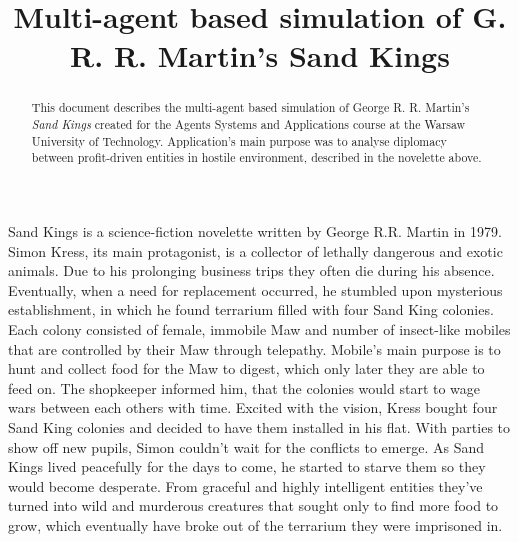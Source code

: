 \documentclass[conference]{IEEEtran}
\title{Multi-agent based simulation of G. R. R. Martin's Sand Kings}
\author{
\IEEEauthorblockN{Jakub Ciecierski, Viet Ba Mai, \\
					Michal Slupczynski and Wojciech Zyskowski}
					
\IEEEauthorblockA{Faculty of Mathematics and Information Science,\\ 
					Warsaw University of Technology \\
					Plac Politechniki 1, 00-660 Warsaw, Poland}
}
\begin{document}
\maketitle








\begin{abstract}

This document describes the multi-agent based simulation of George R. R. Martin's \textit{Sand Kings} created for the Agents Systems and Applications course at the Warsaw University of Technology. Application's main purpose was to analyse diplomacy between profit-driven entities in hostile environment, described in the novelette above. 

\end{abstract}

Sand Kings is a science-fiction novelette written by George R.R. Martin in 1979. Simon Kress, its main protagonist, is a collector of lethally dangerous and exotic animals. Due to his prolonging business trips they often die during his absence. Eventually, when a need for replacement occurred, he stumbled upon mysterious establishment, in which he found terrarium filled with four Sand King colonies. Each colony consisted of female, immobile Maw and number of insect-like mobiles that are controlled by their Maw through telepathy. Mobile's main purpose is to hunt and collect food for the Maw to digest, which only later they are able to feed on. The shopkeeper informed him, that the colonies would start to wage wars between each others with time.
Excited with the vision, Kress bought four Sand King colonies and decided to have them installed in his flat. With parties to show off new pupils, Simon couldn't wait for the conflicts to emerge. As Sand Kings lived peacefully for the days to come, he started to starve them so they would become desperate. From graceful and highly intelligent entities they've turned into wild and murderous creatures that sought only to find more food to grow, which eventually have broke out of the terrarium they were imprisoned in.
\end{document}
